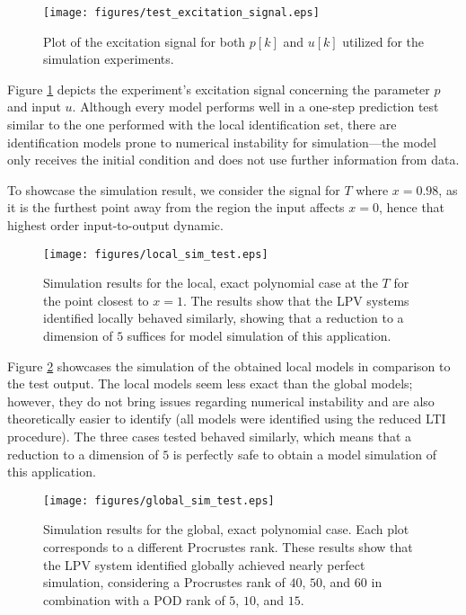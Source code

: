 \begin{figure}
    \centering
    \texttt{[image: figures/test\_excitation\_signal.eps]}
    \caption{Plot of the excitation signal for both $p[k]$ and $u[k]$ utilized for the simulation experiments.}
    \label{fig:test_excitation}
\end{figure}

Figure \ref{fig:test_excitation} depicts the experiment's excitation signal concerning the parameter $p$ and input $u$.
%
Although every model performs well in a one-step prediction test similar to the one performed with the local identification set, there are identification models prone to numerical instability for simulation---the model only receives the initial condition and does not use further information from data.
%

To showcase the simulation result, we consider the signal for $T$ where $x = 0.98$, as it is the furthest point away from the region the input affects $x = 0$, hence that highest order input-to-output dynamic.

\begin{figure}
    \centering
    \texttt{[image: figures/local\_sim\_test.eps]}
    \caption{Simulation results for the local, exact polynomial case at the $T$ for the point closest to $x = 1$. The results show that the LPV systems identified locally behaved similarly, showing that a reduction to a dimension of $5$ suffices for model simulation of this application.}
    \label{fig:local_test}
\end{figure}

Figure \ref{fig:local_test} showcases the simulation of the obtained local models in comparison to the test output.
%
The local models seem less exact than the global models; however, they do not bring issues regarding numerical instability and are also theoretically easier to identify (all models were identified using the reduced LTI procedure).
%
The three cases tested behaved similarly, which means that a reduction to a dimension of $5$ is perfectly safe to obtain a model simulation of this application.


\begin{figure}
    \centering
    \texttt{[image: figures/global\_sim\_test.eps]}
    \caption{Simulation results for the global, exact polynomial case. Each plot corresponds to a different Procrustes rank. These results show that the LPV system identified globally achieved nearly perfect simulation, considering a Procrustes rank of $40$, $50$, and $60$ in combination with a POD rank of $5$, $10$, and $15$.}
    \label{fig:global_test}
\end{figure}

